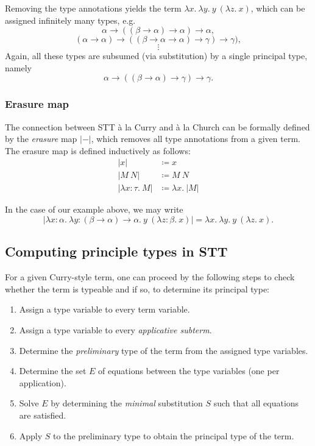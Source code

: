 Removing the type annotations yields the term
$\lambda x.\ \lambda y.\ y\ (\lambda z.\ x)$,
which can be assigned infinitely many types, e.g.
\[ \alpha \to ((\beta \to \alpha) \to \alpha) \to \alpha, \]
\[ (\alpha \to \alpha) \to ((\beta \to \alpha \to \alpha)
    \to \gamma) \to \gamma), \]
\[ \vdots \]
%
Again, all these types are subsumed (via substitution) by a
single principal type, namely
\[ \alpha \to ((\beta \to \alpha) \to \gamma) \to \gamma .\]

\subsubsection{Erasure map}
The connection between STT à la Curry and à la Church can be formally
defined by the \emph{erasure} map $| - |$, which removes all type
annotations from a given term.
The erasure map is defined inductively as follows:
\begin{align*}
    |x| &\coloneqq x \\
    |M\ N| &\coloneqq M\ N \\
    | \lambda x : \tau.\ M | &\coloneqq \lambda x.\ |M|
\end{align*}

In the case of our example above, we may write
\[ | \lambda x : \alpha.\ \lambda y : (\beta \to \alpha) \to \alpha.\
    y\ (\lambda z : \beta.\ x) |
    = \lambda x.\ \lambda y.\ y\ (\lambda z.\ x) .\]


\subsection{Computing principle types in STT}
For a given Curry-style term, one can proceed by the following steps
to check whether the term is typeable and if so,
to determine its principal type:
\begin{enumerate}
    \item Assign a type variable to every term variable.
    \item Assign a type variable to every \emph{applicative subterm}.
    \item Determine the \emph{preliminary} type of the term from the
          assigned type variables.
    \item Determine the set $E$ of equations between the type variables
          (one per application).
    \item Solve $E$ by determining the \emph{minimal} substitution $S$
          such that all equations are satisfied.
    \item Apply $S$ to the preliminary type to obtain the principal type of the term.
\end{enumerate}

